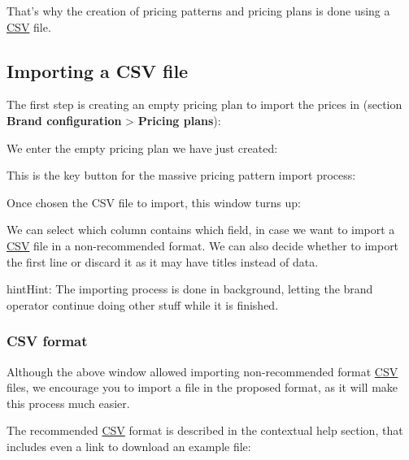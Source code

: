 \documentclass[letterpaper,10pt,english]{sphinxmanual}
\begin{document}
That's why the creation of pricing patterns and pricing plans is done using a
\href{https://es.wikipedia.org/wiki/CSV}{CSV} file.


\subsection{Importing a CSV file}
\label{billing_and_invoices/pricing_plans:importing-a-csv-file}
The first step is creating an empty pricing plan to import the prices in (section
\textbf{Brand configuration} \textgreater{} \textbf{Pricing plans}):

\noindent{}

We enter the empty pricing plan we have just created:

\noindent{}

This is the key button for the massive pricing pattern import process:

\noindent{}

Once chosen the CSV file to import, this window turns up:

\noindent{}

We can select which column contains which field, in case we want to import a
\href{https://es.wikipedia.org/wiki/CSV}{CSV} file in a non-recommended format. We
can also decide whether to import the first line or discard it as it may have
titles instead of data.

\begin{notice}{hint}{Hint:}
The importing process is done in background, letting the brand operator
continue doing other stuff while it is finished.
\end{notice}


\subsubsection{CSV format}
\label{billing_and_invoices/pricing_plans:csv-format}
Although the above window allowed importing non-recommended format \href{https://es.wikipedia.org/wiki/CSV}{CSV}  files, we encourage you to import a file
in the proposed format, as it will make this process much easier.

The recommended \href{https://es.wikipedia.org/wiki/CSV}{CSV} format is described
in the contextual help section, that includes even a link to download an example
file:
\end{document}
